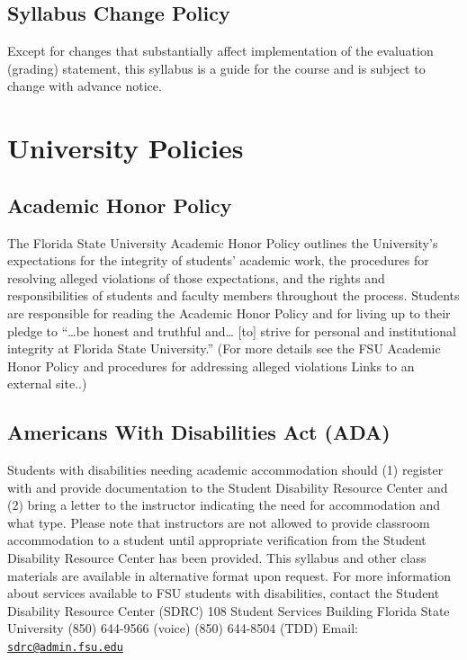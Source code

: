 \documentclass[10pt,]{article}
\begin{document}
\hypertarget{syllabus-change-policy}{%
\subsection{Syllabus Change Policy}\label{syllabus-change-policy}}

Except for changes that substantially affect implementation of the
evaluation (grading) statement, this syllabus is a guide for the course
and is subject to change with advance notice.

\hypertarget{university-policies}{%
\section{University Policies}\label{university-policies}}

\hypertarget{academic-honor-policy}{%
\subsection{Academic Honor Policy}\label{academic-honor-policy}}

The Florida State University Academic Honor Policy outlines the
University's expectations for the integrity of students' academic work,
the procedures for resolving alleged violations of those expectations,
and the rights and responsibilities of students and faculty members
throughout the process. Students are responsible for reading the
Academic Honor Policy and for living up to their pledge to ``\ldots be
honest and truthful and\ldots{} {[}to{]} strive for personal and
institutional integrity at Florida State University.'' (For more details
see the FSU Academic Honor Policy and procedures for addressing alleged
violations Links to an external site..)

\hypertarget{americans-with-disabilities-act-ada}{%
\subsection{Americans With Disabilities Act
(ADA)}\label{americans-with-disabilities-act-ada}}

Students with disabilities needing academic accommodation should (1)
register with and provide documentation to the Student Disability
Resource Center and (2) bring a letter to the instructor indicating the
need for accommodation and what type. Please note that instructors are
not allowed to provide classroom accommodation to a student until
appropriate verification from the Student Disability Resource Center has
been provided. This syllabus and other class materials are available in
alternative format upon request. For more information about services
available to FSU students with disabilities, contact the Student
Disability Resource Center (SDRC) 108 Student Services Building
\textbar{} Florida State University \textbar{} (850) 644-9566 (voice)
\textbar{} (850) 644-8504 (TDD) \textbar{} Email:
\href{mailto:sdrc@admin.fsu.edu}{\nolinkurl{sdrc@admin.fsu.edu}}
\end{document}
